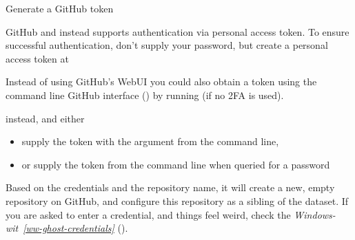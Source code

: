 \ignorespaces \begin{importantnote}[label={index-14}, before title={\thetcbcounter\ }, check odd page=true]{Generate a GitHub token}
\label{\detokenize{basics/101-130-yodaproject:index-14}}

\sphinxAtStartPar
GitHub  and instead supports authentication via personal access token.
To ensure successful authentication, don’t supply your password, but create a personal access token at %
\begin{footnote}\sphinxAtStartFootnote
Instead of using GitHub’s WebUI you could also obtain a token using the command line GitHub interface () by running  (if no 2FA is used).
%
\end{footnote} instead, and either
\begin{itemize}
\item {} 
\sphinxAtStartPar
supply the token with the argument  from the command line,

\item {} 
\sphinxAtStartPar
or supply the token from the command line when queried for a password

\end{itemize}


\end{importantnote}

\sphinxAtStartPar
Based on the credentials and the
repository name, it will create a new, empty repository on GitHub, and
configure this repository as a sibling of the dataset.
If you are asked to enter a credential, and things feel weird, check
the \textit{Windows-wit}~{\windowswiticoninline}\textit{\ref{ww-ghost-credentials}} {\hyperref[\detokenize{basics/101-130-yodaproject:ww-ghost-credentials}]{}} ().

